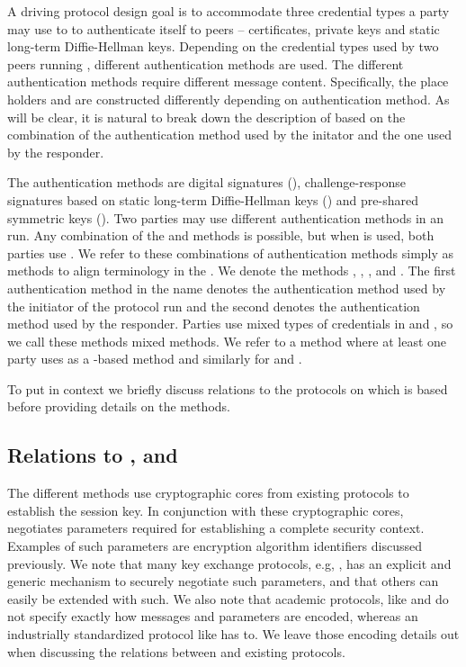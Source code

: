 A driving protocol design goal is to accommodate three credential types
a party may use to to authenticate itself to peers -- certificates, private keys
and static long-term Diffie-Hellman keys.
%
Depending on the credential types used by two peers running \mEdhoc{}, different
authentication methods are used.
%
The different authentication methods require different message content.
%
Specifically, the place holders \mAuthi{} and \mAuthr{} are constructed
differently depending on authentication method.
%
As will be clear, it is natural to break down the description of \mEdhoc{}
based on the combination of the authentication method used by the initator and
the one used by the responder.
%

The authentication methods are digital signatures
(\mSig), challenge-response signatures based on static long-term Diffie-Hellman
keys (\mStat) and pre-shared symmetric keys (\mPsk).
%
Two parties may use different authentication methods in an \mEdhoc{} run.
%
Any combination of the \mSig{} and \mStat{} methods is possible, but when
\mPsk{} is used, both parties use \mPsk{}.
%
We refer to these combinations of authentication methods simply as methods to
align terminology in the \mSpec{}.
%
We denote the methods \mSigSig, \mSigStat, \mStatStat, \mStatSig{} and \mPskPsk.
%
The first authentication method in the name denotes the authentication method
used by the initiator of the protocol run and the second denotes the 
authentication method used by the responder.
%
Parties use mixed types of credentials in \mSigStat{} and \mStatSig{}, so
we call these methods mixed methods.
%
We refer to a method where at least one party uses \mSig{} as a \mSig-based
method and similarly for \mStat{} and \mPsk.
%

To put \mEdhoc{} in context we briefly discuss relations to
the protocols on which \mEdhoc{} is based before providing details on the
methods.
%

\subsection{Relations to \mSigma, \mOptls{} and \mNoise{}}
\label{sec:relationsToOtherProtocols}
The different methods use cryptographic cores from existing protocols to
establish the session key.
%
In conjunction with these cryptographic cores, \mEdhoc{} negotiates parameters
required for establishing a complete \mOscore{} security context.
%
Examples of such parameters are encryption algorithm identifiers discussed
previously.
%
We note that many key exchange protocols, e.g, \mSigma{}, has an explicit and
generic mechanism to securely negotiate such parameters, and that others can
easily be extended with such.
%
We also note that academic protocols, like \mSigma{} and \mOptls{} do not
specify exactly how messages and parameters are encoded, whereas an
industrially standardized protocol like \mEdhoc{} has to.
%
We leave those encoding details out when discussing the relations between
\mEdhoc{} and existing protocols.
%


